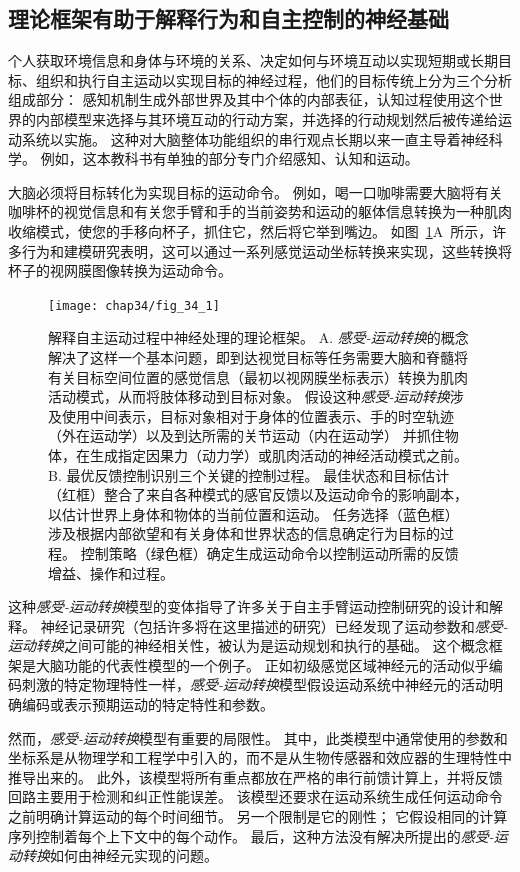 \subsection{理论框架有助于解释行为和自主控制的神经基础}

个人获取环境信息和身体与环境的关系、决定如何与环境互动以实现短期或长期目标、组织和执行自主运动以实现目标的神经过程，他们的目标传统上分为三个分析组成部分：
感知机制生成外部世界及其中个体的内部表征，认知过程使用这个世界的内部模型来选择与其环境互动的行动方案，并选择的行动规划然后被传递给运动系统以实施。
这种对大脑整体功能组织的串行观点长期以来一直主导着神经科学。
例如，这本教科书有单独的部分专门介绍感知、认知和运动。


大脑必须将目标转化为实现目标的运动命令。
例如，喝一口咖啡需要大脑将有关咖啡杯的视觉信息和有关您手臂和手的当前姿势和运动的躯体信息转换为一种肌肉收缩模式，使您的手移向杯子，抓住它，然后将它举到嘴边。
如图~\ref{fig:34_1}A~所示，许多行为和建模研究表明，这可以通过一系列感觉运动坐标转换来实现，这些转换将杯子的视网膜图像转换为运动命令。


\begin{figure}[htbp]
	\centering
	\texttt{[image: chap34/fig\_34\_1]}
	\caption{解释自主运动过程中神经处理的理论框架。
		A. \textit{感受-运动转换}的概念解决了这样一个基本问题，即到达视觉目标等任务需要大脑和脊髓将有关目标空间位置的感觉信息（最初以视网膜坐标表示）转换为肌肉活动模式，从而将肢体移动到目标对象。 
		假设这种\textit{感受-运动转换}涉及使用中间表示，目标对象相对于身体的位置表示、手的时空轨迹（外在运动学）以及到达所需的关节运动（内在运动学） 并抓住物体，在生成指定因果力（动力学）或肌肉活动的神经活动模式之前。 
		B. 最优反馈控制识别三个关键的控制过程。 
		最佳状态和目标估计（红框）整合了来自各种模式的感官反馈以及运动命令的影响副本，以估计世界上身体和物体的当前位置和运动。
		任务选择（蓝色框）涉及根据内部欲望和有关身体和世界状态的信息确定行为目标的过程。
		控制策略（绿色框）确定生成运动命令以控制运动所需的反馈增益、操作和过程。}
	\label{fig:34_1}
\end{figure}


这种\textit{感受-运动转换}模型的变体指导了许多关于自主手臂运动控制研究的设计和解释。
神经记录研究（包括许多将在这里描述的研究）已经发现了运动参数和\textit{感受-运动转换}之间可能的神经相关性，被认为是运动规划和执行的基础。
这个概念框架是大脑功能的代表性模型的一个例子。
正如初级感觉区域神经元的活动似乎编码刺激的特定物理特性一样，\textit{感受-运动转换}模型假设运动系统中神经元的活动明确编码或表示预期运动的特定特性和参数。


然而，\textit{感受-运动转换}模型有重要的局限性。
其中，此类模型中通常使用的参数和坐标系是从物理学和工程学中引入的，而不是从生物传感器和效应器的生理特性中推导出来的。
此外，该模型将所有重点都放在严格的串行前馈计算上，并将反馈回路主要用于检测和纠正性能误差。
该模型还要求在运动系统生成任何运动命令之前明确计算运动的每个时间细节。
另一个限制是它的刚性；
它假设相同的计算序列控制着每个上下文中的每个动作。
最后，这种方法没有解决所提出的\textit{感受-运动转换}如何由神经元实现的问题。


